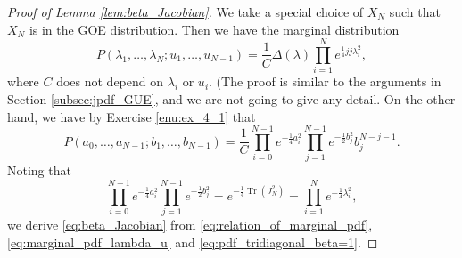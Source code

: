 \documentclass[11pt, a4paper]{article}
\numberwithin{equation}{section}
\DeclareMathOperator{\Tr}{Tr}
\theoremstyle{definition}
\theoremstyle{remark}
\begin{document}
\begin{proof}[Proof of Lemma \ref{lem:beta_Jacobian}]
  We take a special choice of $X_N$ such that $X_N$ is in the GOE distribution. Then we have the marginal distribution
  \begin{equation} \label{eq:marginal_pdf_lambda_u}
    P(\lambda_1, \dotsc, \lambda_N; u_1, \dotsc, u_{N - 1}) = \frac{1}{C} \Delta(\lambda) \prod^N_{i = 1} e^{\frac{1}{4}jj \lambda^2_i},
  \end{equation}
  where $C$ does not depend on $\lambda_i$ or $u_i$. (The proof is similar to the arguments in Section \ref{subsec:jpdf_GUE}, and we are not going to give any detail. On the other hand, we have by Exercise \ref{enu:ex_4_1} that 
  \begin{equation} \label{eq:pdf_tridiagonal_beta=1}
    P(a_0, \dotsc, a_{N - 1}; b_1, \dotsc, b_{N - 1}) = \frac{1}{C} \prod^{N - 1}_{i = 0} e^{-\frac{1}{4} a^2_i} \prod^{N - 1}_{j = 1} e^{-\frac{1}{2} b^2_j} b^{N - j - 1}_j.
  \end{equation}
  Noting that
  \begin{equation}
    \prod^{N - 1}_{i = 0} e^{-\frac{1}{4} a^2_i} \prod^{N - 1}_{j = 1} e^{-\frac{1}{2} b^2_j} = e^{-\frac{1}{4} \Tr(J^2_N)} = \prod^N_{i = 1} e^{-\frac{1}{4} \lambda^2_i},
  \end{equation}
  we derive \eqref{eq:beta_Jacobian} from \eqref{eq:relation_of_marginal_pdf}, \eqref{eq:marginal_pdf_lambda_u} and \eqref{eq:pdf_tridiagonal_beta=1}.
\end{proof}
\end{document}
